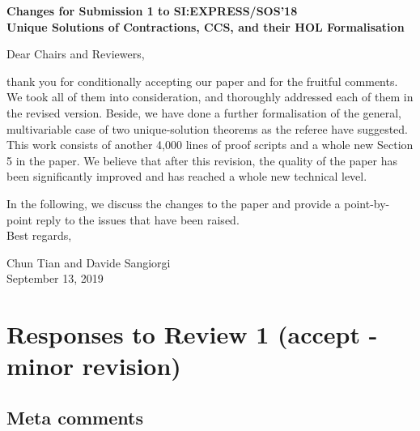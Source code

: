 \begin{center}
\textbf{
{\small Changes for Submission 1 to SI:EXPRESS/SOS'18}\\[5mm]
{\large Unique Solutions of Contractions, CCS, and their HOL
  Formalisation
}}
\end{center}

Dear Chairs and Reviewers,

\vskip 10pt
\noindent

thank you for conditionally accepting our paper and for the fruitful
comments. We took all of them into consideration, and thoroughly
addressed each of them in the revised version. Beside, we have done
a further formalisation of the general, multivariable case of two
unique-solution theorems as the referee have suggested. This work
consists of another 4,000 lines of proof scripts and a whole new
Section 5 in the paper. We believe that after
this revision, the quality of the paper has been significantly
improved and has reached a whole new technical level.

In the following, we discuss the changes to the paper and provide a
point-by-point reply to the issues that have been raised.
\ \\

Best regards,
\begin{flushright}
  Chun Tian and Davide Sangiorgi \\
  September 13, 2019
\end{flushright}

\vspace{1cm}

\section*{Responses to Review 1 (accept - minor revision)}

\subsection*{Meta comments}


